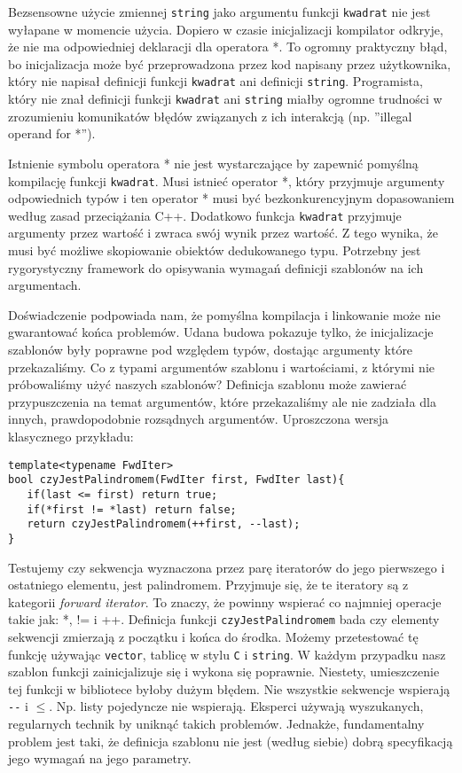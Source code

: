 \documentclass[11pt, a4paper]{article}
\begin{document}
Bezsensowne użycie zmiennej \verb#string# jako argumentu funkcji \verb#kwadrat# nie jest wyłapane w momencie użycia. Dopiero w czasie inicjalizacji kompilator odkryje, że nie ma odpowiedniej deklaracji dla operatora *. To ogromny praktyczny błąd, bo inicjalizacja może być przeprowadzona przez kod napisany przez użytkownika, który nie napisał definicji funkcji \verb#kwadrat# ani definicji \verb#string#. Programista, który nie znał definicji funkcji \verb#kwadrat# ani \verb#string# miałby ogromne trudności w zrozumieniu komunikatów błędów związanych z ich interakcją (np. ”illegal operand for *”).

Istnienie symbolu operatora * nie jest wystarczające by zapewnić pomyślną kompilację funkcji \verb#kwadrat#. Musi istnieć operator *, który przyjmuje argumenty odpowiednich typów i ten operator * musi być bezkonkurencyjnym dopasowaniem według zasad przeciążania C++. Dodatkowo funkcja \verb#kwadrat# przyjmuje argumenty przez wartość i zwraca swój wynik przez wartość. Z tego wynika, że musi być możliwe skopiowanie obiektów dedukowanego typu. Potrzebny jest rygorystyczny framework do opisywania wymagań definicji szablonów na ich argumentach.

Doświadczenie podpowiada nam, że pomyślna kompilacja i linkowanie może nie gwarantować końca problemów. Udana budowa pokazuje tylko, że inicjalizacje szablonów były poprawne pod względem typów, dostając argumenty które przekazaliśmy. Co z typami argumentów szablonu i wartościami, z którymi nie próbowaliśmy użyć naszych szablonów? Definicja szablonu może zawierać przypuszczenia na temat argumentów, które przekazaliśmy ale nie zadziała dla innych, prawdopodobnie rozsądnych argumentów. Uproszczona wersja klasycznego przykładu:

\begin{lstlisting}[frame=single]
template<typename FwdIter>
bool czyJestPalindromem(FwdIter first, FwdIter last){
   if(last <= first) return true;
   if(*first != *last) return false;
   return czyJestPalindromem(++first, --last);
}

\end{lstlisting}

Testujemy czy sekwencja wyznaczona przez parę iteratorów do jego pierwszego i ostatniego elementu, jest palindromem. Przyjmuje się, że te iteratory są z kategorii \emph{forward iterator}. To znaczy, że powinny wspierać co najmniej operacje takie jak: *, != i ++. Definicja funkcji \verb#czyJestPalindromem# bada czy elementy sekwencji zmierzają z początku i końca do środka. Możemy przetestować tę funkcję używając \verb#vector#, tablicę w stylu \verb#C# i \verb#string#. W każdym przypadku nasz szablon funkcji zainicjalizuje się i wykona się poprawnie. Niestety, umieszczenie tej funkcji w bibliotece byłoby dużym błędem. Nie wszystkie sekwencje wspierają \verb#--# i $\leq$. Np. listy pojedyncze nie wspierają. Eksperci używają wyszukanych, regularnych technik by uniknąć takich problemów.  Jednakże, fundamentalny problem jest taki, że definicja szablonu nie jest (według siebie) dobrą specyfikacją jego wymagań na jego parametry.
\end{document}
